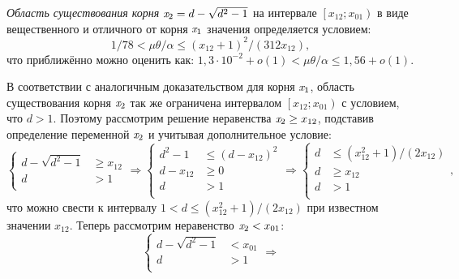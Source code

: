 \begin{Statement*}
    \textit{Область существования корня} $\mathit{x}_{2} = d - \sqrt{d^{2} - 1}$ на интервале $\left[x_{12}; x_{01}\right)$ в виде вещественного и отличного от корня $\mathit{x}_{1}$ значения определяется условием: $$ 1 / 78 < \mu \theta / \alpha \le (x_{12} + 1)^{2} / (312 x_{12}), $$ что приближённо можно оценить как: $1,3 \cdot 10^{-2} + o(1) < \mu \theta / \alpha \le 1,56 + o(1)$.
\end{Statement*}
\begin{Proof}
    В соответствии с аналогичным доказательством для корня $\mathit{x}_{1}$, область существования корня $\mathit{x}_{2}$ так же ограничена интервалом $\left[x_{12}; x_{01}\right)$ с условием, что $d > 1$. Поэтому рассмотрим решение неравенства $\mathit{x}_{2} \ge x_{12}$, подставив определение переменной $\mathit{x}_{2}$ и учитывая дополнительное условие:
    \begin{equation}
        \nonumber
        \begin{cases}
            d - \sqrt{d^{2} - 1} &\ge x_{12} \\
            d &> 1 \\
        \end{cases}
        \Rightarrow
        \begin{cases}
            d^{2} - 1 &\le \left( d - x_{12} \right)^{2} \\
            d - x_{12} &\ge 0 \\
            d &> 1 \\
        \end{cases}
        \Rightarrow
        \begin{cases}
            d &\le (x_{12}^{2} + 1) / (2 x_{12}) \\
            d &\ge x_{12} \\
            d &> 1 \\
        \end{cases},
    \end{equation}
    что можно свести к интервалу $1 < d \le (x_{12}^{2} + 1) / (2 x_{12})$ при известном значении $x_{12}$. Теперь рассмотрим неравенство $\mathit{x}_{2} < x_{01}$:
    \begin{equation}
        \nonumber
        \begin{cases}
            d - \sqrt{d^{2} - 1} &< x_{01} \\
            d &> 1 \\
        \end{cases}
        \Rightarrow

\end{equation}
\end{Proof}
